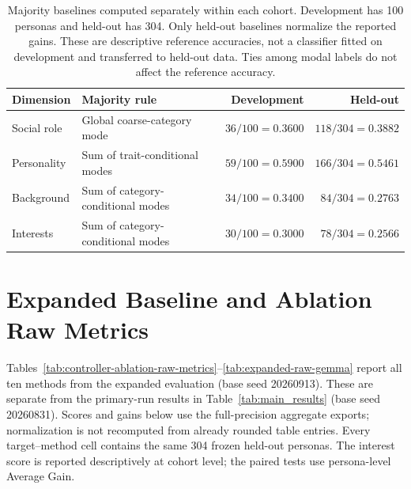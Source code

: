 \documentclass{ieeeaccess}
\begin{document}
\clearpage
\renewcommand{\thetable}{S2e}
\begin{table}[H]
\centering
\footnotesize
\caption{Majority baselines computed separately within each cohort. Development has 100 personas and held-out has 304. Only held-out baselines normalize the reported gains. These are descriptive reference accuracies, not a classifier fitted on development and transferred to held-out data. Ties among modal labels do not affect the reference accuracy.}
\label{tab:cohort-baselines}
\begin{tabular*}{\textwidth}{@{\extracolsep{\fill}}llrr@{}}
\toprule
Dimension & Majority rule & Development & Held-out \\
\midrule
Social role & Global coarse-category mode & $36/100=0.3600$ & $118/304=0.3882$ \\
Personality & Sum of trait-conditional modes & $59/100=0.5900$ & $166/304=0.5461$ \\
Background & Sum of category-conditional modes & $34/100=0.3400$ & $84/304=0.2763$ \\
Interests & Sum of category-conditional modes & $30/100=0.3000$ & $78/304=0.2566$ \\
\bottomrule
\end{tabular*}
\end{table}

\section{Expanded Baseline and Ablation Raw Metrics}
\label{app:expanded-raw-metrics}
Tables~\ref{tab:controller-ablation-raw-metrics}--\ref{tab:expanded-raw-gemma}
report all ten methods from the expanded evaluation (base seed 20260913).
These are separate from the primary-run results in Table~\ref{tab:main_results}
(base seed 20260831). Scores and gains below use the full-precision aggregate exports;
normalization is not recomputed from already rounded table entries. Every target--method
cell contains the same 304 frozen held-out personas. The interest score is reported
descriptively at cohort level; the paired tests use persona-level Average Gain.
\end{document}
